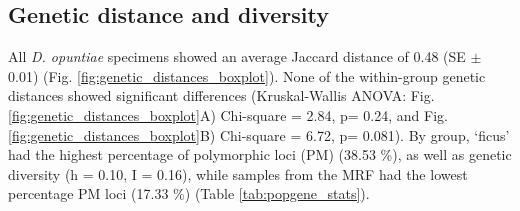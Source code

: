 




\subsection{Genetic distance and diversity}
All \textit{D. opuntiae} specimens showed an average Jaccard distance of 0.48 (SE $\pm$ 0.01) (Fig. \ref{fig:genetic_distances_boxplot}). None of the within-group genetic distances showed significant differences (Kruskal-Wallis ANOVA: Fig. \ref{fig:genetic_distances_boxplot}A)  Chi-square = 2.84, p= 0.24, and Fig. \ref{fig:genetic_distances_boxplot}B) Chi-square = 6.72, p= 0.081).
By group, `ficus' had the highest percentage of polymorphic loci (PM) (38.53 \%), as well as genetic diversity (h = 0.10, I = 0.16), while samples from the MRF had the lowest percentage PM loci (17.33 \%) (Table \ref{tab:popgene_stats}). \\

